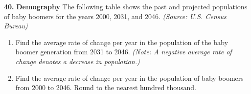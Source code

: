 \documentclass{ximera}
\begin{document}
\begin{problem}
\textbf{40.} \textbf{Demography} The following table shows the past and projected populations of
  baby boomers for the years 2000, 2031, and 2046. \emph{(Source: U.S. Census Bureau)}
  \begin{enumerate}[label=\textbf{\alph*.},leftmargin=2em,topsep=2pt,itemsep=1pt]
    \item Find the average rate of change per year in the population of the baby boomer
          generation from 2031 to 2046. \emph{(Note: A negative average rate of change
          denotes a decrease in population.)}
    \item Find the average rate of change per year in the population of baby boomers from
          2000 to 2046. Round to the nearest hundred thousand.
  \end{enumerate}
\end{problem}
\end{document}
